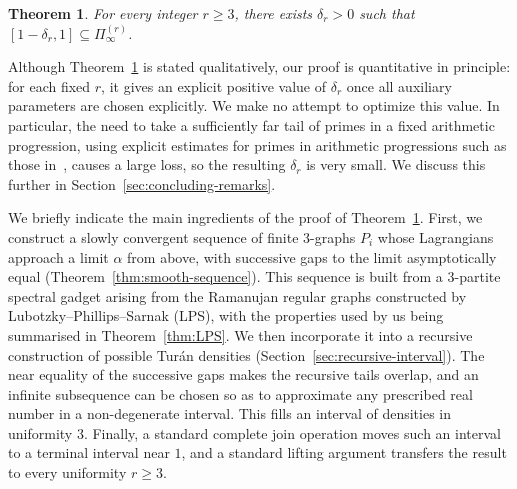 \documentclass[10pt]{article}
\numberwithin{equation}{section}
\newtheorem{theorem}{Theorem}[section]
\begin{document}
\begin{theorem}\label{thm:main} For every integer $r\ge 3$, there exists $\delta_r>0$ such that $[1-\delta_r,1]\subseteq \Pi^{(r)}_\infty$. \end{theorem}

Although Theorem~\ref{thm:main} is stated qualitatively, our proof is quantitative in principle: for each fixed $r$, it gives an explicit positive value of $\delta_r$ once all auxiliary parameters are chosen explicitly. We make no attempt to optimize this value. In particular, the need to take a sufficiently far tail of primes in a fixed arithmetic progression, using explicit estimates for primes in arithmetic progressions such as those in~\cite{BennettMartinOBryantRechnitzer2018}, causes a large loss, so the resulting $\delta_r$ is very small. We discuss this further in Section~\ref{sec:concluding-remarks}.

We briefly indicate the main ingredients of the proof of Theorem~\ref{thm:main}. First, we construct a slowly convergent sequence of finite $3$-graphs $P_i$ whose Lagrangians approach a limit $\alpha$ from above, with successive gaps to the limit asymptotically equal (Theorem~\ref{thm:smooth-sequence}). 
This sequence is built from a $3$-partite spectral gadget arising from the Ramanujan regular graphs constructed by  Lubotzky--Phillips--Sarnak (LPS), with the properties used by us being summarised in Theorem~\ref{thm:LPS}. We then incorporate it into a recursive construction of possible Tur\'an densities (Section~\ref{sec:recursive-interval}). The near equality of the successive gaps makes the recursive tails overlap, and an infinite subsequence can be chosen so as to approximate any prescribed real number in a non-degenerate interval. This fills an interval of densities in uniformity $3$. Finally, a standard complete join operation moves such an interval to a terminal interval near $1$, and a standard lifting argument transfers the result to every uniformity $r\ge3$.

\bigskip 
\end{document}
